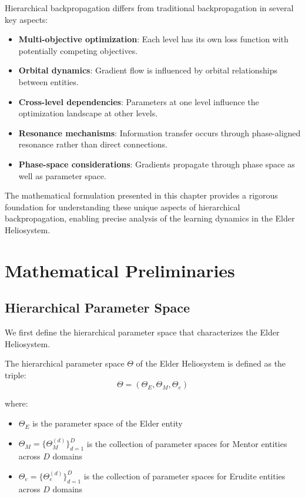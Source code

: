 Hierarchical backpropagation differs from traditional backpropagation in several key aspects:

\begin{itemize}
    \item \textbf{Multi-objective optimization}: Each level has its own loss function with potentially competing objectives.
    \item \textbf{Orbital dynamics}: Gradient flow is influenced by orbital relationships between entities.
    \item \textbf{Cross-level dependencies}: Parameters at one level influence the optimization landscape at other levels.
    \item \textbf{Resonance mechanisms}: Information transfer occurs through phase-aligned resonance rather than direct connections.
    \item \textbf{Phase-space considerations}: Gradients propagate through phase space as well as parameter space.
\end{itemize}

The mathematical formulation presented in this chapter provides a rigorous foundation for understanding these unique aspects of hierarchical backpropagation, enabling precise analysis of the learning dynamics in the Elder Heliosystem.

\section{Mathematical Preliminaries}

\subsection{Hierarchical Parameter Space}

We first define the hierarchical parameter space that characterizes the Elder Heliosystem.

\begin{definition}
The hierarchical parameter space $\Theta$ of the Elder Heliosystem is defined as the triple:
\begin{equation}
\Theta = (\Theta_E, \Theta_M, \Theta_e)
\end{equation}

where:
\begin{itemize}
    \item $\Theta_E$ is the parameter space of the Elder entity
    \item $\Theta_M = \{\Theta_M^{(d)}\}_{d=1}^D$ is the collection of parameter spaces for Mentor entities across $D$ domains
    \item $\Theta_e = \{\Theta_e^{(d)}\}_{d=1}^D$ is the collection of parameter spaces for Erudite entities across $D$ domains
\end{itemize}
\end{definition}

